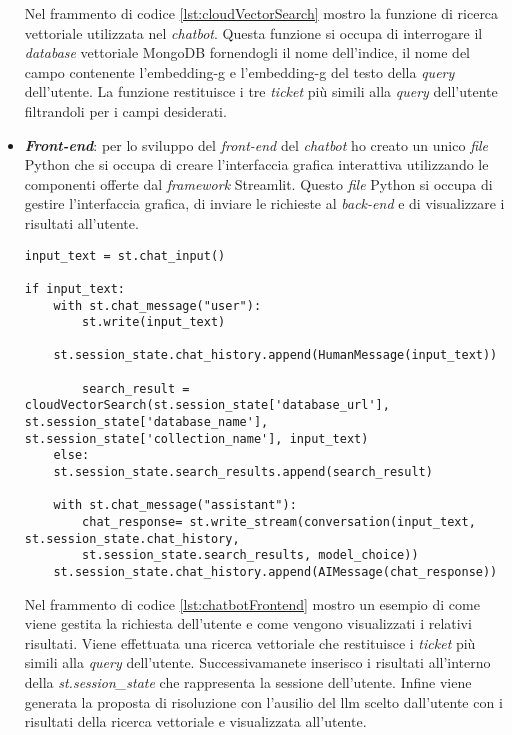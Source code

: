 \begin{itemize}
    Nel frammento di codice \ref{lst:cloudVectorSearch} mostro la funzione di ricerca vettoriale utilizzata nel \textit{chatbot}. Questa funzione si occupa di interrogare il \textit{database} vettoriale MongoDB fornendogli il nome dell'indice, il nome del campo contenente l'\gls{embedding-g} e l'\gls{embedding-g} del testo della \textit{query} dell'utente. La funzione restituisce i tre \textit{ticket} più simili alla \textit{query} dell'utente filtrandoli per i campi desiderati.
    \item \textbf{\textit{Front-end}}: per lo sviluppo del \textit{front-end} del \textit{chatbot} ho creato un unico \textit{file} Python che si occupa di creare l'interfaccia grafica interattiva utilizzando le componenti offerte dal \textit{framework} Streamlit. Questo \textit{file} Python si occupa di gestire l'interfaccia grafica, di inviare le richieste al \textit{back-end} e di visualizzare i risultati all'utente.
    \begin{verbatim}
input_text = st.chat_input()

if input_text:
    with st.chat_message("user"):
        st.write(input_text)

    st.session_state.chat_history.append(HumanMessage(input_text))

        search_result = cloudVectorSearch(st.session_state['database_url'], st.session_state['database_name'], st.session_state['collection_name'], input_text)
    else:
    st.session_state.search_results.append(search_result)

    with st.chat_message("assistant"):
        chat_response= st.write_stream(conversation(input_text, st.session_state.chat_history,
        st.session_state.search_results, model_choice))
    st.session_state.chat_history.append(AIMessage(chat_response))
    \end{verbatim}
    \label{lst:chatbotFrontend} 

    Nel frammento di codice \ref{lst:chatbotFrontend} mostro un esempio di come viene gestita la richiesta dell'utente e come vengono visualizzati i relativi risultati. Viene effettuata una ricerca vettoriale che restituisce i \textit{ticket} più simili alla \textit{query} dell'utente. 
    Successivamanete inserisco i risultati all'interno della \textit{st.session\_state} che rappresenta la sessione dell'utente. Infine viene generata la proposta di risoluzione con l'ausilio del \gls{llm} scelto dall'utente con i risultati della ricerca vettoriale e visualizzata all'utente.
\end{itemize}

